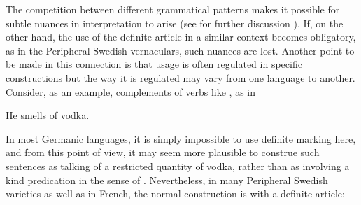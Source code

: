 \ea 
	\z	 
\z

The competition between different grammatical patterns makes it possible for subtle nuances in interpretation to arise (see for further discussion \citet[128-134]{Dahl2004}). If, on the other hand, the use of the definite article in a similar context becomes obligatory, as in the Peripheral Swedish vernaculars, such nuances are lost. Another point to be made in this connection is that usage is often regulated in specific constructions but the way it is regulated may vary from one language to another. Consider, as an example, complements of verbs like , as in

\ea
\gl He smells of vodka.  
 \z


In most Germanic languages, it is simply impossible to use definite marking here, and from this point of view, it may seem more plausible to construe such sentences as talking of a restricted quantity of vodka, rather than as involving a kind predication in the sense of \citet{KrifkaEtAl1995}. Nevertheless, in many Peripheral Swedish varieties as well as in French, the normal construction is with a definite article: 

\ea \label{} 
\z 
\z


